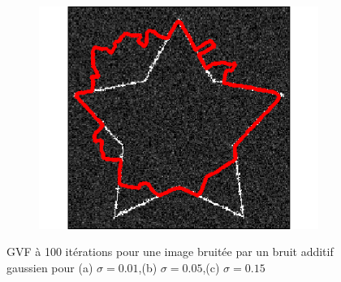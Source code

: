 \begin{figure}[H]
\begin{subfigure}[c]{0.3\linewidth}
\includegraphics[width=\textwidth]{Chapters/Images/Noise/gvfg15}
\caption{}
\end{subfigure}
\caption{GVF à 100 itérations pour une image bruitée par un bruit additif gaussien pour (a) $\sigma = 0.01$,(b) $\sigma = 0.05$,(c) $\sigma = 0.15$}
\end{figure}

